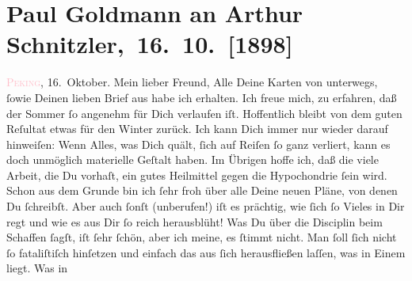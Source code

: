 

               \section[ Paul Goldmann an Arthur Schnitzler, 16. 10. {[}1898{]}]{Paul Goldmann an Arthur Schnitzler, 16. 10. {[}1898{]}}\nopagebreak{}\rehead{ }\normalsize\beginnumbering{} \toendnotes[C]{\smallbreak\pagebreak[2]} 
\toendnotes[C]{\smallbreak}\pstart
           \raggedleft{}{\pb}\textsc{\textcolor{pink}{Peking}{}\ledrightnote{\textcolor{pink}{Peking}}}, 16. Oktober.\pend
           \pstart\center{}Mein lieber Freund,\pend\pstart
           Alle Deine Karten von unterwegs, ſowie Deinen lieben Brief aus \label{K_L02861-1v}\label{K_L02861-1h} habe
               ich erhalten.\pend
           \pstart
           Ich freue mich, zu erfahren, daß der Sommer ſo angenehm für Dich verlaufen iſt.
               Hoffentlich bleibt von dem guten Reſultat etwas für den Winter zurück. \strikeout{\textcolor{gray}{×}} Ich kann Dich immer nur wieder darauf hinweiſen: Wenn Alles, was Dich quält,
               ſich auf Reiſen ſo ganz verliert, kann es doch unmöglich materielle Geſtalt haben. Im
               Übrigen hoffe ich, daß die viele Arbeit, die Du vorhaſt, ein gutes Heilmittel gegen
               die Hypochondrie ſein wird. Schon aus dem Grunde {\pb}bin ich ſehr froh über alle Deine neuen Pläne, von denen Du ſchreibſt. Aber auch
               ſonſt (unberufen!) iſt es prächtig, wie ſich ſo \strikeout{\textcolor{gray}{V}} Vieles in Dir regt und wie es aus Dir ſo reich herausblüht!\pend
           \pstart
           Was Du über die Disciplin beim Schaffen ſagſt, iſt ſehr ſchön, aber ich meine, es
               ſtimmt nicht. Man ſoll ſich nicht ſo fataliſtiſch hinſetzen\strikeout{,} und einfach das aus ſich herausfließen laſſen, was in Einem liegt. Was in
